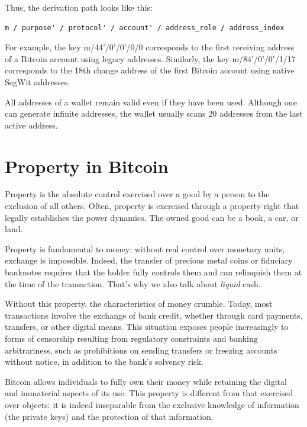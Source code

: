 \documentclass[
  a5paper,
  smalldemyvopaper,10pt,twoside,onecolumn,openright,extrafontsizes,hidelinks]{memoir}
\begin{document}
Thus, the derivation path looks like this:

\begin{verbatim}
m / purpose' / protocol' / account' / address_role / address_index
\end{verbatim}

For example, the key m/44'/0'/0'/0/0 corresponds to the first receiving
address of a Bitcoin account using legacy addresses. Similarly, the key
m/84'/0'/0'/1/17 corresponds to the 18th change address of the first
Bitcoin account using native SegWit addresses.

All addresses of a wallet remain valid even if they have been used.
Although one can generate infinite addresses, the wallet usually scans
20 addresses from the last active address.

\section*{Property in Bitcoin}\label{property-in-bitcoin}


Property is the absolute control exercised over a good by a person to
the exclusion of all others. Often, property is exercised through a
property right that legally establishes the power dynamics. The owned
good can be a book, a car, or land.

Property is fundamental to money: without real control over monetary
units, exchange is impossible. Indeed, the transfer of precious metal
coins or fiduciary banknotes requires that the holder fully controls
them and can relinquish them at the time of the transaction. That's why
we also talk about \emph{liquid} cash.

Without this property, the characteristics of money crumble. Today, most
transactions involve the exchange of bank credit, whether through card
payments, transfers, or other digital means. This situation exposes
people increasingly to forms of censorship resulting from regulatory
constraints and banking arbitrariness, such as prohibitions on sending
transfers or freezing accounts without notice, in addition to the bank's
solvency risk.

Bitcoin allows individuals to fully own their money while retaining the
digital and immaterial aspects of its use. This property is different
from that exercised over objects: it is indeed inseparable from the
exclusive knowledge of information (the private keys) and the protection
of that information.
\end{document}
